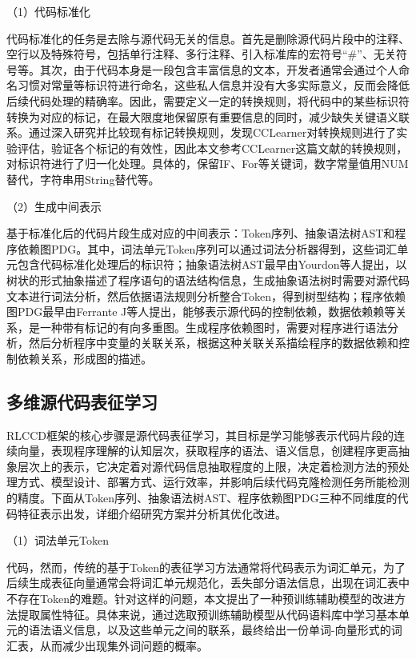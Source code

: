 （1）代码标准化

代码标准化的任务是去除与源代码无关的信息。首先是删除源代码片段中的注释、空行以及特殊符号，包括单行注释、多行注释、引入标准库的宏符号“\#”、无关符号等。其次，由于代码本身是一段包含丰富信息的文本，开发者通常会通过个人命名习惯对常量等标识符进行命名，这些私人信息并没有大多实际意义，反而会降低后续代码处理的精确率。因此，需要定义一定的转换规则，将代码中的某些标识符转换为对应的标记，在最大限度地保留原有重要信息的同时，减少缺失关键语义联系。通过深入研究并比较现有标记转换规则，发现CCLearner\cite{10.1145/1287624.1287634}对转换规则进行了实验评估，验证各个标记的有效性，因此本文参考CCLearner\cite{10.1145/1287624.1287634}这篇文献的转换规则，对标识符进行了归一化处理。具体的，保留IF、For等关键词，数字常量值用NUM替代，字符串用String替代等。


（2）生成中间表示

基于标准化后的代码片段生成对应的中间表示：Token序列、抽象语法树AST和程序依赖图PDG。其中，词法单元Token序列可以通过词法分析器得到，这些词汇单元包含代码标准化处理后的标识符；抽象语法树AST最早由Yourdon等人\cite{10.1145/1499949.1499997}提出，以树状的形式抽象描述了程序语句的语法结构信息，生成抽象语法树时需要对源代码文本进行词法分析，然后依据语法规则分析整合Token，得到树型结构；程序依赖图PDG最早由Ferrante J等人\cite{10.1145/24039.24041}提出，能够表示源代码的控制依赖，数据依赖赖等关系，是一种带有标记的有向多重图。生成程序依赖图时，需要对程序进行语法分析，然后分析程序中变量的关联关系，根据这种关联关系描绘程序的数据依赖和控制依赖关系，形成图的描述。

\subsection{多维源代码表征学习}
\label{subsec:Representation}
RLCCD框架的核心步骤是源代码表征学习，其目标是学习能够表示代码片段的连续向量，表现程序理解的认知层次，获取程序的语法、语义信息，创建程序更高抽象层次上的表示，它决定着对源代码信息抽取程度的上限，决定着检测方法的预处理方式、模型设计、部署方式、运行效率，并影响后续代码克隆检测任务所能检测的精度。下面从Token序列、抽象语法树AST、程序依赖图PDG三种不同维度的代码特征表示出发，详细介绍研究方案并分析其优化改进。

（1）词法单元Token

代码，然而，传统的基于Token的表征学习方法通常将代码表示为词汇单元，为了后续生成表征向量通常会将词汇单元规范化，丢失部分语法信息，出现在词汇表中不存在Token的难题。针对这样的问题，本文提出了一种预训练辅助模型的改进方法提取属性特征。具体来说，通过选取预训练辅助模型从代码语料库中学习基本单元的语法语义信息，以及这些单元之间的联系，最终给出一份单词-向量形式的词汇表，从而减少出现集外词问题的概率。

